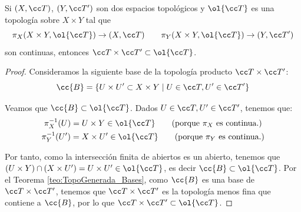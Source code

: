 \begin{prop}
    Si $(X,\T)$, $(Y,\T')$ son dos espacios topológicos y $\ol{\T}$ es una topología sobre $X\times Y$ tal que
    \begin{equation*}
       \pi_X(X\times Y, \ol{\T})\to (X,\T)
       \qquad
       \pi_Y(X\times Y, \ol{\T})\to (Y,\T')
    \end{equation*}
    son continuas, entonces $\T\times \T'\subset \ol{\T}$.
\end{prop}
\begin{proof}
    Consideramos la siguiente base de la topología producto $\T\times \T'$:
    $$\cc{B}=\{U\times U'\subset X\times Y\mid U\in \T, U'\in \T'\}$$
    
    Veamos que $\cc{B}\subset \ol{\T}$. Dados $U\in \T, U'\in \T'$, tenemos que:
    \begin{gather*}
        \pi_X^{-1}(U)=U\times Y \in \ol{\T} \qquad \text{(porque $\pi_X$ es continua.)}\\
        \pi_Y^{-1}(U')=X\times U' \in \ol{\T} \qquad \text{(porque $\pi_Y$ es continua.)}
    \end{gather*}

    Por tanto, como la intersección finita de abiertos es un abierto, tenemos que $(U\times Y)\cap (X\times U')=U\times U'\in \ol{\T}$, es decir $\cc{B}\subset \ol{\T}$. Por el Teorema \ref{teo:TopoGenerada_Bases}, como $\cc{B}$ es una base de $\T\times \T'$, tenemos que $\T\times \T'$ es la topología menos fina que contiene a $\cc{B}$, por lo que $\T\times \T'\subset \ol{\T}$.
\end{proof}


